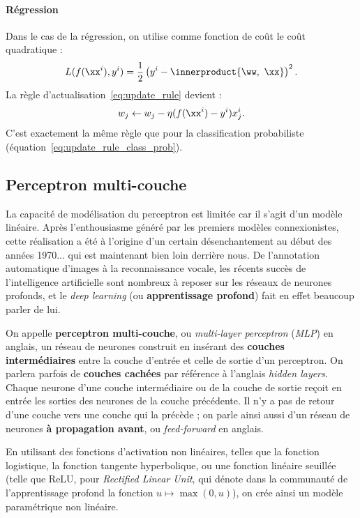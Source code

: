 \paragraph{Régression}
Dans le cas de la régression, on utilise comme fonction de coût le
coût quadratique :
\begin{equation}
  L(f(\xx^i), y^i) = 
  \frac12 \left(y^i - \innerproduct{\ww,~\xx}\right)^2.
\end{equation}
La règle d'actualisation~\eqref{eq:update_rule} devient :
\begin{equation}
  \label{eq:update_rule_reg}
  w_j \leftarrow w_j - \eta (f(\xx^i) - y^i) x_j^i.
\end{equation}
C'est exactement la même règle que pour la classification probabiliste (équation~\eqref{eq:update_rule_class_prob}).



\subsection{Perceptron multi-couche}
\label{sec:mlp}
La capacité de modélisation du perceptron est limitée car il s'agit d'un modèle
linéaire. Après l'enthousiasme généré par les premiers modèles connexionistes,
cette réalisation a été à l'origine d'un certain désenchantement au début des
années 1970... qui est maintenant bien loin derrière nous.
De l'annotation automatique d'images à la reconnaissance vocale, les récents
succès de l'intelligence artificielle sont nombreux à reposer sur les réseaux
de neurones profonds, et le {\it deep learning} (ou \textbf{apprentissage
  profond}) fait en effet beaucoup parler de lui.

On appelle \textbf{perceptron multi-couche}, ou {\it multi-layer perceptron}
({\it MLP}) en anglais, un réseau de neurones construit en insérant des
\textbf{couches intermédiaires} entre la couche d'entrée et celle de sortie
d'un perceptron. On parlera parfois de \textbf{couches cachées} par référence à
l'anglais {\it hidden layers}. Chaque neurone d'une couche intermédiaire ou de
la couche de sortie reçoit en entrée les sorties des neurones de la couche
précédente. Il n'y a pas de retour d'une couche vers une couche qui la précède
; on parle ainsi aussi d'un réseau de neurones \textbf{à propagation avant}, ou
{\it feed-forward} en anglais.
  
En utilisant des fonctions d'activation non linéaires, telles que la fonction
logistique, la fonction tangente hyperbolique, ou une fonction linéaire
seuillée (telle que ReLU, pour {\it Rectified Linear Unit}, qui dénote dans la
communauté de l'apprentissage profond la fonction $u \mapsto \max(0, u)$), on
crée ainsi un modèle paramétrique non linéaire.

